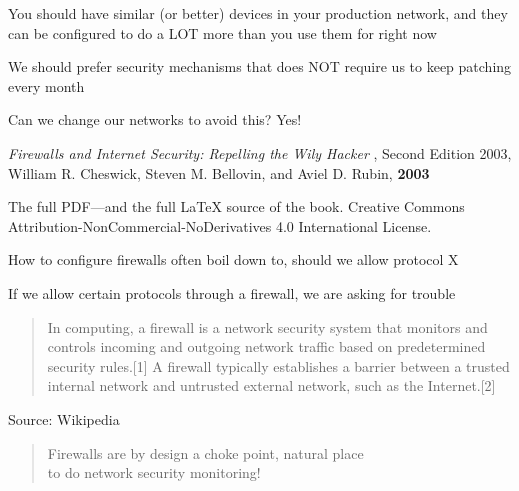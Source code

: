 \documentclass[Screen16to9,17pt]{foils}
\begin{document}
You should have similar (or better) devices in your production network, and they can be
configured to do a LOT more than you use them for right now




\begin{list2}
\item We should prefer security mechanisms that does NOT require us to keep patching every month
\item Can we change our networks to avoid this? Yes!
\end{list2}




\begin{list2}
\item \emph{Firewalls and Internet Security: Repelling the Wily Hacker} , Second Edition 2003, William R. Cheswick, Steven M. Bellovin, and Aviel D. Rubin, {\bf 2003} 
\item The full PDF—and the full LaTeX source of the book.
Creative Commons Attribution-NonCommercial-NoDerivatives 4.0 International License.
\item How to configure firewalls often boil down to, should we allow protocol X
\item If we allow certain protocols through a firewall, we are asking for trouble
\end{list2}



\begin{quote}
In computing, a firewall is a network security system that monitors and controls incoming and outgoing network traffic based on predetermined security rules.[1] A firewall typically establishes a barrier between a trusted internal network and untrusted external network, such as the Internet.[2]
\end{quote}
Source: Wikipedia 

\begin{quote}
Firewalls are by design a choke point, natural place \\
to do network security monitoring!
\end{quote}
\end{document}
